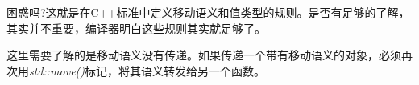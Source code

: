 困惑吗?这就是在C++标准中定义移动语义和值类型的规则。是否有足够的了解，其实并不重要，编译器明白这些规则其实就足够了。

这里需要了解的是移动语义没有传递。如果传递一个带有移动语义的对象，必须再次用\textit{std::move()}标记，将其语义转发给另一个函数。












































